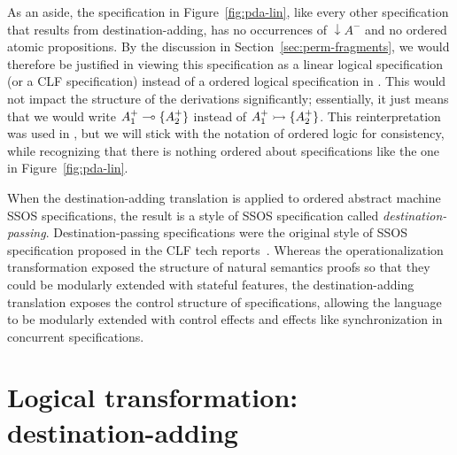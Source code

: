 As an aside, the specification in Figure~\ref{fig:pda-lin}, like every
other specification that results from destination-adding, has no
occurrences of ${\downarrow}A^-$ and no ordered atomic propositions. By
the discussion in Section~\ref{sec:perm-fragments}, we would therefore
be justified in viewing this specification as a linear logical
specification (or a CLF specification) instead of a ordered logical
specification in \sls.  This would not impact the structure of the
derivations significantly; essentially, it just means that we would
write $A^+_1 \multimap \{ A^+_2 \}$ instead of $A^+_1 \rightarrowtail \{ A^+_2
\}$.  This reinterpretation was used in \cite{simmons11logical}, but
we will stick with the notation of ordered logic for consistency,
while recognizing that there is nothing ordered
about specifications like the one in Figure~\ref{fig:pda-lin}. 

When the destination-adding translation is applied to ordered abstract
machine SSOS specifications, the result is a style of SSOS
specification called {\it destination-passing}. Destination-passing
specifications were the original style of SSOS specification proposed
in the CLF tech reports~\cite{cervesato02concurrent}. Whereas the
operationalization transformation exposed the structure of natural
semantics proofs so that they could be modularly extended with
stateful features, the destination-adding translation exposes the
control structure of specifications, allowing the language to be
modularly extended with control effects and effects like
synchronization in concurrent specifications.

\section{Logical transformation: destination-adding}
\label{sec:destination-adding}


